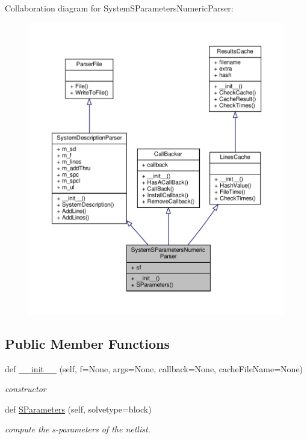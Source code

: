 Collaboration diagram for System\+S\+Parameters\+Numeric\+Parser\+:\nopagebreak
\begin{figure}[H]
\begin{center}
\leavevmode
\includegraphics[width=350pt]{classSignalIntegrity_1_1Parsers_1_1SystemSParametersParser_1_1SystemSParametersNumericParser__coll__graph}
\end{center}
\end{figure}
\subsection*{Public Member Functions}
\begin{DoxyCompactItemize}
\item 
def \hyperlink{classSignalIntegrity_1_1Parsers_1_1SystemSParametersParser_1_1SystemSParametersNumericParser_a5ce77900c33ce9b681aebb5c527ab92a}{\+\_\+\+\_\+init\+\_\+\+\_\+} (self, f=None, args=None, callback=None, cache\+File\+Name=None)
\begin{DoxyCompactList}\small\item\em constructor \end{DoxyCompactList}\item 
def \hyperlink{classSignalIntegrity_1_1Parsers_1_1SystemSParametersParser_1_1SystemSParametersNumericParser_a8d7c0357cfcdfd41f8cca9627ff9a61f}{S\+Parameters} (self, solvetype=\textquotesingle{}block\textquotesingle{})
\begin{DoxyCompactList}\small\item\em compute the s-\/parameters of the netlist. \end{DoxyCompactList}\end{DoxyCompactItemize}


